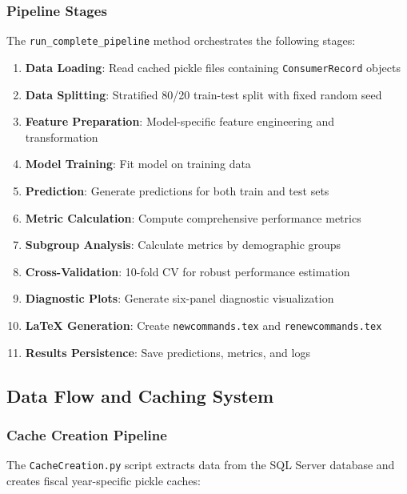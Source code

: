 \subsubsection{Pipeline Stages}

The \texttt{run\_complete\_pipeline} method orchestrates the following stages:

\begin{enumerate}
    \item \textbf{Data Loading}: Read cached pickle files containing \texttt{ConsumerRecord} objects
    \item \textbf{Data Splitting}: Stratified 80/20 train-test split with fixed random seed
    \item \textbf{Feature Preparation}: Model-specific feature engineering and transformation
    \item \textbf{Model Training}: Fit model on training data
    \item \textbf{Prediction}: Generate predictions for both train and test sets
    \item \textbf{Metric Calculation}: Compute comprehensive performance metrics
    \item \textbf{Subgroup Analysis}: Calculate metrics by demographic groups
    \item \textbf{Cross-Validation}: 10-fold CV for robust performance estimation
    \item \textbf{Diagnostic Plots}: Generate six-panel diagnostic visualization
    \item \textbf{LaTeX Generation}: Create \texttt{newcommands.tex} and \texttt{renewcommands.tex}
    \item \textbf{Results Persistence}: Save predictions, metrics, and logs
\end{enumerate}

\subsection{Data Flow and Caching System}

\subsubsection{Cache Creation Pipeline}

The \texttt{CacheCreation.py} script extracts data from the SQL Server database and creates fiscal year-specific pickle caches:

